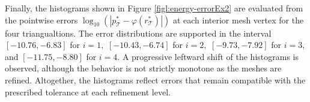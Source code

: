 \documentclass[a4paper,11pt]{article}
\theoremstyle{definition}
\theoremstyle{remark}
\numberwithin{equation}{section}
\newcommand{\disr}{r_\calT}
\newcommand{\disp}{p_\calT}
\newcommand{\calT}{\mathcal{T}}
\begin{document}
Finally, the histograms shown in Figure \ref{figl:energy-errorEx2} are evaluated from the pointwise errors \(\log_{10}(| \disp^* -\varphi(\disr^*)|) \) at each interior mesh vertex for the four triangualtions. The error distributions are supported in the interval $[-10.76, -6.83]$ for  $i=1,$ $[-10.43,-6.74]$ for $i=2,$ $[-9.73, -7.92 ]$ for  $i=3$, and $[-11.75, -8.80]$ for $i=4.$ 
A progressive leftward shift of the histograms is observed, although the behavior is not strictly monotone as the meshes are refined. Altogether, the histograms reflect errors that remain compatible with the prescribed tolerance at each refinement level.

   

\end{document}
